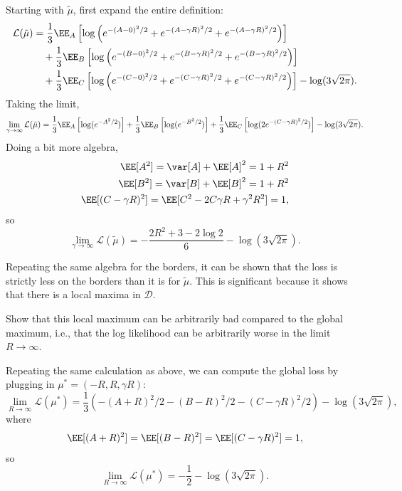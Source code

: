 Starting with $\tilde{\mu}$, first expand the entire definition: 
\begin{align*}
	\mathcal{L}(\tilde{\mu}) &= \frac{1}{3}\EE_A\left[\log \left(e^{-(A-0)^2/2} + e^{-(A-\gamma R)^2/2} + e^{-(A - \gamma R)^2/2}\right) \right] \\
													 &\quad + \frac{1}{3}\EE_B\left[\log \left(e^{-(B-0)^2/2} + e^{-(B-\gamma R)^2/2} + e^{-(B - \gamma R)^2/2}\right) \right] \\
													 &\quad + \frac{1}{3}\EE_C\left[\log \left(e^{-(C-0)^2/2} + e^{-(C-\gamma R)^2/2} + e^{-(C - \gamma R)^2/2}\right) \right] - \log(3\sqrt{2\pi}).  
\end{align*}
Taking the limit,
\begin{align*}
	\lim_{\gamma\rightarrow \infty}\mathcal{L}(\tilde{\mu}) = \frac{1}{3}\EE_A \left[\log(e^{-A^2/2})\right] + \frac{1}{3}\EE_B \left[\log(e^{-B^2/2})\right] + \frac{1}{3}\EE_C \left[\log(2e^{-(C-\gamma R)^2/2})\right] - \log(3\sqrt{2\pi}).  
\end{align*}
Doing a bit more algebra, 
\begin{align*}
	\EE[A^2] = \var[A] + \EE[A]^2 = 1 + R^2\\
	\EE[B^2] = \var[B] + \EE[B]^2 = 1 + R^2\\
	\EE[(C - \gamma R)^2] = \EE[C^2 - 2C\gamma R + \gamma^2R^2] = 1,
\end{align*}
so 
\[\lim_{\gamma\rightarrow \infty}\mathcal{L}(\tilde{\mu}) = -\frac{2R^2 + 3 - 2\log 2}{6} - \log(3\sqrt{2\pi}).\]

Repeating the same algebra for the borders, it can be shown that the loss is strictly less on the borders than it is for $\tilde{\mu}$. This is significant because it shows that there is a local maxima in $\mathcal{D}$. 

\begin{example}
\exlabel

Show that this local maximum can be arbitrarily bad compared to the global maximum, i.e., that the log likelihood can be arbitrarily worse in the limit $R\rightarrow \infty$.  
\end{example}

Repeating the same calculation as above, we can compute the global loss by plugging in $\mu^*=(-R,R,\gamma R)$: 
\[\lim_{R\rightarrow \infty}\mathcal{L}(\mu^*) = \frac{1}{3}\left( -(A+R)^2/2 - (B-R)^2/2 - (C - \gamma R)^2/2 \right) - \log(3\sqrt{2\pi}),\]
where 
\begin{align*}
	\EE[(A+R)^2] = \EE[(B-R)^2] = \EE[(C-\gamma R)^2] = 1,
\end{align*}
so 
\[\lim_{R\rightarrow \infty}\mathcal{L}(\mu^*) = -\frac{1}{2} - \log(3\sqrt{2\pi}).\] 


